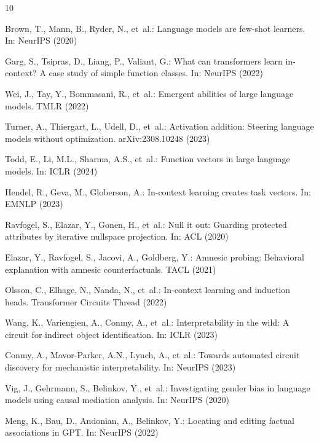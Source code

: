 \documentclass[runningheads]{llncs}
\begin{document}

\begin{thebibliography}{10}

Brown, T., Mann, B., Ryder, N., et~al.: Language models are few-shot learners.
  In: NeurIPS (2020)

Garg, S., Tsipras, D., Liang, P., Valiant, G.: What can transformers learn
  in-context? A case study of simple function classes. In: NeurIPS (2022)

Wei, J., Tay, Y., Bommasani, R., et~al.: Emergent abilities of large language
  models. TMLR (2022)

Turner, A., Thiergart, L., Udell, D., et~al.: Activation addition: Steering
  language models without optimization. arXiv:2308.10248 (2023)

Todd, E., Li, M.L., Sharma, A.S., et~al.: Function vectors in large language
  models. In: ICLR (2024)

Hendel, R., Geva, M., Globerson, A.: In-context learning creates task vectors.
  In: EMNLP (2023)

Ravfogel, S., Elazar, Y., Gonen, H., et~al.: Null it out: Guarding protected
  attributes by iterative nullspace projection. In: ACL (2020)

Elazar, Y., Ravfogel, S., Jacovi, A., Goldberg, Y.: Amnesic probing: Behavioral
  explanation with amnesic counterfactuals. TACL (2021)

Olsson, C., Elhage, N., Nanda, N., et~al.: In-context learning and induction
  heads. Transformer Circuits Thread (2022)

Wang, K., Variengien, A., Conmy, A., et~al.: Interpretability in the wild: A
  circuit for indirect object identification. In: ICLR (2023)

Conmy, A., Mavor-Parker, A.N., Lynch, A., et~al.: Towards automated circuit
  discovery for mechanistic interpretability. In: NeurIPS (2023)

Vig, J., Gehrmann, S., Belinkov, Y., et~al.: Investigating gender bias in
  language models using causal mediation analysis. In: NeurIPS (2020)

Meng, K., Bau, D., Andonian, A., Belinkov, Y.: Locating and editing factual
  associations in GPT. In: NeurIPS (2022)


\end{thebibliography}
\end{document}
